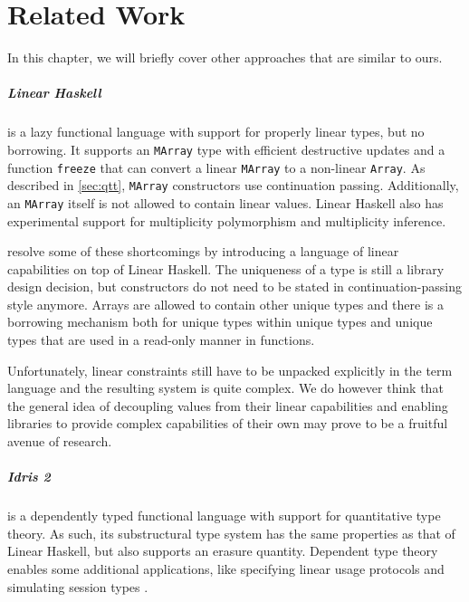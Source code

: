\chapter{Related Work}\label{sec:relatedwork}
In this chapter, we will briefly cover other approaches that are similar to ours.

\paragraph{Linear Haskell} is a lazy functional language with support for properly linear types, but no borrowing. It supports an \lstinline|MArray| type with efficient destructive updates and a function \lstinline|freeze| that can convert a linear \lstinline|MArray| to a non-linear \lstinline|Array|. As described in \cref{sec:qtt}, \lstinline|MArray| constructors use continuation passing. Additionally, an \lstinline|MArray| itself is not allowed to contain linear values. Linear Haskell also has experimental support for multiplicity polymorphism and multiplicity inference.

\cite{spiwack_linearly_2022} resolve some of these shortcomings by introducing a language of linear capabilities on top of Linear Haskell. The uniqueness of a type is still a library design decision, but constructors do not need to be stated in continuation-passing style anymore. Arrays are allowed to contain other unique types and there is a borrowing mechanism both for unique types within unique types and unique types that are used in a read-only manner in functions. 

Unfortunately, linear constraints still have to be unpacked explicitly in the term language and the resulting system is quite complex. We do however think that the general idea of decoupling values from their linear capabilities and enabling libraries to provide complex capabilities of their own may prove to be a fruitful avenue of research.

\paragraph{Idris 2 \citep{brady_idris_2021}} is a dependently typed functional language with support for quantitative type theory. As such, its substructural type system has the same properties as that of Linear Haskell, but also supports an erasure quantity. Dependent type theory enables some additional applications, like specifying linear usage protocols and simulating session types \citep{honda_types_1993}.

